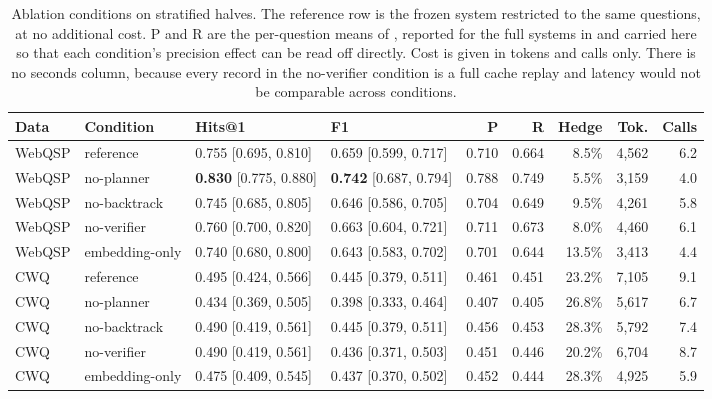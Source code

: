 \begin{table}[!tb]
  \begin{center}
    \caption[Ablation conditions on stratified halves]{Ablation conditions on
    stratified halves. The reference row is the frozen system restricted to the
    same questions, at no additional cost. P and R are the per-question means of
    , reported for the full systems in  and
    carried here so that each condition's precision effect can be read off
    directly. Cost is given in tokens and calls only. There is no seconds
    column, because every record in the \textsf{no-verifier} condition is a full
    cache replay and latency would not be comparable across conditions.}
    \label{tab:ablation}
    \footnotesize
    \setlength{\tabcolsep}{3pt}
    \begin{tabular}{|l|l|l|l|r|r|r|r|r|}
      \hline
      \textbf{Data} & \textbf{Condition} & \textbf{Hits@1} & \textbf{F1} &
      \textbf{P} & \textbf{R} & \textbf{Hedge} & \textbf{Tok.} & \textbf{Calls}
      \\
      \hline
      WebQSP & reference       & 0.755 [0.695, 0.810] & 0.659 [0.599, 0.717] &
        0.710 & 0.664 & 8.5\%  & 4{,}562 & 6.2 \\
      WebQSP & no-planner      & \textbf{0.830} [0.775, 0.880] & \textbf{0.742}
        [0.687, 0.794] & 0.788 & 0.749 & 5.5\%  & 3{,}159 & 4.0 \\
      WebQSP & no-backtrack    & 0.745 [0.685, 0.805] & 0.646 [0.586, 0.705] &
        0.704 & 0.649 & 9.5\%  & 4{,}261 & 5.8 \\
      WebQSP & no-verifier     & 0.760 [0.700, 0.820] & 0.663 [0.604, 0.721] &
        0.711 & 0.673 & 8.0\%  & 4{,}460 & 6.1 \\
      WebQSP & embedding-only  & 0.740 [0.680, 0.800] & 0.643 [0.583, 0.702] &
        0.701 & 0.644 & 13.5\% & 3{,}413 & 4.4 \\
      \hline
      CWQ & reference       & 0.495 [0.424, 0.566] & 0.445 [0.379, 0.511] &
        0.461 & 0.451 & 23.2\% & 7{,}105 & 9.1 \\
      CWQ & no-planner      & 0.434 [0.369, 0.505] & 0.398 [0.333, 0.464] &
        0.407 & 0.405 & 26.8\% & 5{,}617 & 6.7 \\
      CWQ & no-backtrack    & 0.490 [0.419, 0.561] & 0.445 [0.379, 0.511] &
        0.456 & 0.453 & 28.3\% & 5{,}792 & 7.4 \\
      CWQ & no-verifier     & 0.490 [0.419, 0.561] & 0.436 [0.371, 0.503] &
        0.451 & 0.446 & 20.2\% & 6{,}704 & 8.7 \\
      CWQ & embedding-only  & 0.475 [0.409, 0.545] & 0.437 [0.370, 0.502] &
        0.452 & 0.444 & 28.3\% & 4{,}925 & 5.9 \\
      \hline
    \end{tabular}
  \end{center}
\end{table}

